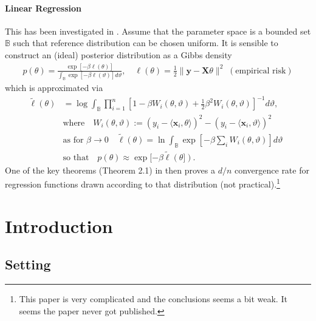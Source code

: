 \documentclass[10pt,a4paper]{article}
\begin{document}
\paragraph{Linear Regression}

This has been investigated in \cite{audibert2010linear}. Assume that the parameter space is a bounded set $\mathbb B$ such that reference distribution can be chosen uniform. It is sensible to construct an (ideal) posterior distribution as a Gibbs density 
\begin{align}
 p(\theta) = \frac{\exp \left[ -\beta \ell(\theta) \right]}{\int_{\mathbb B}  \exp \left[ -\beta \ell(\vartheta) \right] d\vartheta}, \quad \ell(\theta) = \frac 12 \| \mathbf y - \mathbf X \theta\|^2 \; (\text{empirical risk})
\end{align}
which is approximated via
\begin{align}
\tilde \ell(\theta) & = \log \int_{\mathbb B} \prod_{i=1}^n [1 - \beta W_i(\theta,\vartheta) + \tfrac 12 \beta^2 W_i(\theta,\vartheta)]^{-1} d\vartheta, \quad \\
& \text{where} \quad  W_i(\theta, \vartheta) := (y_i - \langle \mathbf x_i, \theta \rangle)^2 - (y_i - \langle \mathbf x_i, \vartheta \rangle)^2
\\
& \text{as for $\beta \to 0$} \quad \tilde\ell(\theta)  = \ln \int_{\mathbb B} \exp\left[- \beta \sum_i W_i(\theta,\vartheta)\right]d\vartheta\\
& \text{so that} \quad p(\theta) \approx \exp[-\beta \tilde \ell(\theta]).
\end{align}
One of the key theorems (Theorem 2.1) in \cite{audibert2010linear} then proves a $d/n$ convergence rate for regression functions drawn according to that distribution (not practical).\footnote{This paper is very complicated and the conclusions seems a bit weak. It seems the paper never got published.}



\newpage



\section{Introduction}
\subsection{Setting}
\end{document}
